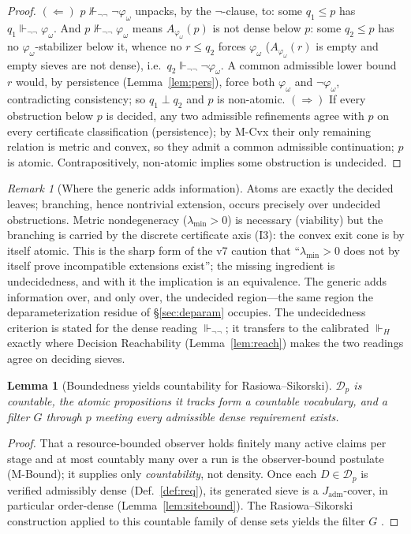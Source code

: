 \documentclass[11pt]{article}
\newtheorem{lemma}{Lemma}
\theoremstyle{definition}
\theoremstyle{remark}
\newtheorem*{remark}{Remark}
\newcommand{\forcesH}{\Vdash_{H}}
\newcommand{\forcesnn}{\Vdash_{\neg\neg}}
\newcommand{\nforcesnn}{\nVdash_{\neg\neg}}
\newcommand{\refines}{\leq}
\newcommand{\lmin}{\lambda_{\min}}
\newcommand{\Jadm}{J_{\mathrm{adm}}}
\begin{document}
\begin{proof}
$(\Leftarrow)$ $p\nforcesnn\neg\varphi_\omega$ unpacks, by the $\neg$-clause, to: some $q_1\refines
p$ has $q_1\forcesnn\varphi_\omega$. And $p\nforcesnn\varphi_\omega$ means $A_{\varphi_\omega}(p)$
is not dense below $p$: some $q_2\refines p$ has no $\varphi_\omega$-stabilizer below it, whence no
$r\refines q_2$ forces $\varphi_\omega$ ($A_{\varphi_\omega}(r)$ is empty and empty sieves are not
dense), i.e.\ $q_2\forcesnn\neg\varphi_\omega$. A common admissible lower bound $r$ would, by
persistence (Lemma~\ref{lem:pers}), force both $\varphi_\omega$ and $\neg\varphi_\omega$,
contradicting consistency; so $q_1\perp q_2$ and $p$ is non-atomic. $(\Rightarrow)$ If every
obstruction below $p$ is decided, any two admissible refinements agree with $p$ on every certificate
classification (persistence); by M-Cvx their only remaining relation is metric and convex, so they
admit a common admissible continuation; $p$ is atomic. Contrapositively, non-atomic implies some
obstruction is undecided.
\end{proof}

\begin{remark}[Where the generic adds information]
Atoms are exactly the decided leaves; branching, hence nontrivial extension, occurs precisely over
undecided obstructions. Metric nondegeneracy ($\lmin>0$) is necessary (viability) but the branching
is carried by the discrete certificate axis (I3): the convex exit cone is by itself atomic. This is
the sharp form of the v7 caution that ``$\lmin>0$ does not by itself prove incompatible extensions
exist''; the missing ingredient is undecidedness, and with it the implication is an equivalence. The
generic adds information over, and only over, the undecided region---the same region the
deparameterization residue of \S\ref{sec:deparam} occupies. The undecidedness criterion is stated
for the dense reading $\forcesnn$; it transfers to the calibrated $\forcesH$ exactly where Decision
Reachability (Lemma~\ref{lem:reach}) makes the two readings agree on deciding sieves.
\end{remark}

\begin{lemma}[Boundedness yields countability for Rasiowa--Sikorski]\label{lem:bdd}
$\mathcal{D}_p$ is countable, the atomic propositions it tracks form a countable vocabulary, and a
filter $G$ through $p$ meeting every admissible dense requirement exists.
\end{lemma}

\begin{proof}
That a resource-bounded observer holds finitely many active claims per stage and at most countably
many over a run is the observer-bound postulate (M-Bound); it supplies only \emph{countability}, not
density. Once each $D\in\mathcal{D}_p$ is verified admissibly dense (Def.~\ref{def:req}), its
generated sieve is a $\Jadm$-cover, in particular order-dense (Lemma~\ref{lem:sitebound}). The
Rasiowa--Sikorski construction applied to this countable family of dense sets yields the filter $G$
\cite{rasiowa-sikorski,gpst}.
\end{proof}
\end{document}
